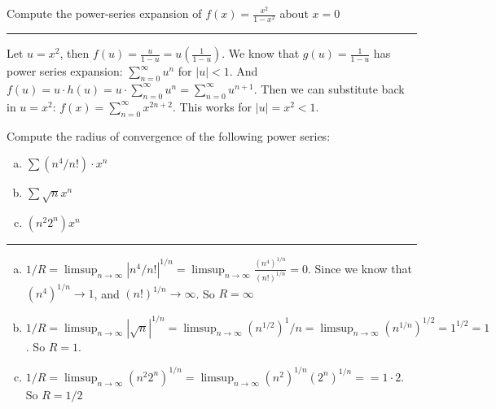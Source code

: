 \documentclass[11pt]{article}
\begin{document}
Compute the power-series expansion of $f(x) = \frac{x^2}{1-x^2}$ about $x=0$

\hrule


Let $u = x^2$, then $f(u) = \frac{u}{1-u} = u \left( \frac{1}{1-u} \right)$.
We know that $g(u) = \frac{1}{1-u}$ has power series expansion: $\sum_{n=0} ^\infty u^n$ for $|u| < 1$.
And $f(u) = u \cdot h(u) = u \cdot \sum_{n=0} ^\infty u^n = \sum_{n=0} ^\infty u^{n+1}$.
Then we can substitute back in $u = x^2$: $f(x) = \sum_{n=0} ^\infty x^{2n+2}$.
This works for $|u| = x^2 < 1$.




Compute the radius of convergence of the following power series:

\begin{enumerate}[a.]
    \item $\sum (n^4/n!) \cdot x^n$
    \item $\sum \sqrt{n} x^n$
    \item $(n^2 2^n) x^n$
\end{enumerate}

\hrule

\begin{enumerate}[a.]
    \item $1/R = \limsup_{n \to \infty} |n^4/n!|^{1/n} = 
    \limsup_{n \to \infty} \frac{(n^4)^{1/n}}{(n!)^{1/n}} = 0$.
     Since we know that $(n^4)^{1/n} \to 1$, and $(n!)^{1/n} \to \infty$. So $R = \infty$
    
    \item $1/R = \limsup_{n \to \infty} |\sqrt{n}|^{1/n} = \limsup_{n \to \infty} (n ^{1/2})^1/n =
    \limsup_{n \to \infty} (n ^{1/n})^{1/2} = 1^{1/2} = 1$. So $R = 1$.

    \item $1/R = \limsup_{n \to \infty} (n^2 2^n) ^{1/n} = \limsup_{n \to \infty} (n^2)^{1/n} (2^n) ^{1/n} =
    = 1 \cdot 2$. So $R = 1/2$

    \end{enumerate}
\end{document}
